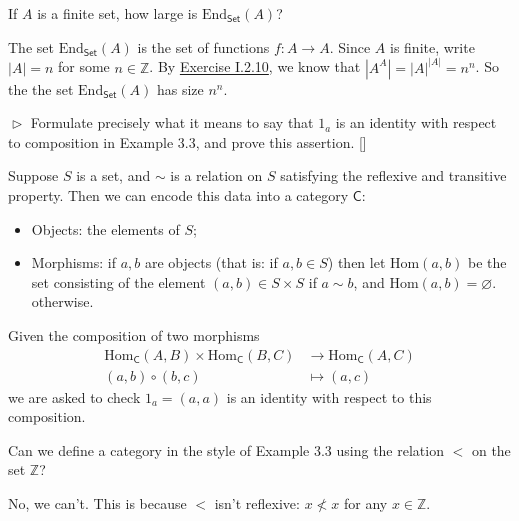 \documentclass[12pt,letterpaper,boxed]{hmcpset}
\newcommand{\Hom}{\mathrm{Hom}}
\newcommand{\abs}[1]{\left|#1\right|}
\begin{document}
\begin{problem}[3.2]
	If $A$ is a finite set, how large is $\mathrm{End}_{\mathsf{Set}}(A)$?
\end{problem}
\begin{solution}
	The set $\mathrm{End}_{\mathsf{Set}}(A)$ is the set of functions $f:A\to A$.
	Since $A$ is finite, write $\abs{A} = n$ for some $n\in\mathbb{Z}$. By \hyperlink{Exercise I.2.10}{Exercise I.2.10}, we know that $\abs{A^A} = \abs{A}^{\abs{A}} = n^n$. So the the set
	$\mathrm{End}_{\mathsf{Set}}(A)$ has size $n^n$.
\end{solution}



\begin{problem}[3.3]
	$\vartriangleright$ Formulate precisely what it means to say that $1_a$ is an identity with respect to composition in Example 3.3, and prove this assertion. []
\end{problem}
\begin{solution}
	Suppose $S$ is a set, and $\sim$ is a relation on $S$ satisfying the reflexive and transitive property. Then we can encode this data into a category $\mathsf{C}$:
	\begin{itemize}
		\item Objects: the elements of $S$;
		\item Morphisms: if $a, b$ are objects (that is: if $a, b \in S$) then let $\Hom(a, b)$ be the set consisting of the element $(a, b) \in S \times S$ if $a \sim b$, and $\Hom(a, b) = \varnothing$.
		otherwise.
	\end{itemize}
    Given the composition of two morphisms
	\begin{align*}
		\Hom_\mathsf{C}(A,B) \times\Hom_\mathsf{C}(B,C)&\longrightarrow\Hom_\mathsf{C}(A,C)\\
		(a,b)\circ(b,c)&\longmapsto(a,c)
	\end{align*}
	we are asked to check $1_a = (a, a)$ is an identity with respect
	to this composition.
\end{solution}

\begin{problem}[3.4]
	Can we define a category in the style of Example 3.3 using the relation $<$ on
	the set $\mathbb{Z}$?
\end{problem}
\begin{solution}
	No, we can't. This is because $<$ isn't reflexive: $x\not<x$ for any
	$x\in\mathbb{Z}$.
\end{solution}
\end{document}
